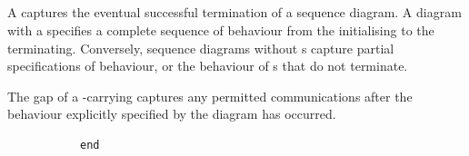 \subsection{\mfinalaction}\label{ssec:metamodel-actions-final}

A \mfinalaction{} captures the eventual successful termination of a
sequence diagram.  A diagram with a \mfinalaction{} specifies a
complete sequence of behaviour from the \mtarget{} initialising to the
\mtarget{} terminating.  Conversely, sequence diagrams without
\mfinalaction s capture partial specifications of behaviour, or the
behaviour of \mtarget s that do not terminate.

\begin{remark}
The gap of a \mfinalaction-carrying \mactionstep{} captures
any permitted communications after the behaviour explicitly specified by the
diagram has occurred.
\end{remark}

\begin{figure}[h!]

\begin{subfigure}[t]{\egtextwidth}
\begin{lstlisting}[style=Example]
end
\end{lstlisting}
\end{subfigure}
\hfill
\begin{subfigure}[t]{\eggraphicalwidth}
\gsecaption
\centering
{}
\end{subfigure}

\end{figure}

